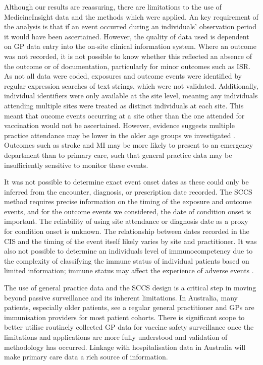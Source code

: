 \documentclass[review, endfloat]{elsarticle}
\begin{document}
Although our results are reassuring, there are limitations to the use of MedicineInsight data and the methods which were applied. An key requirement of the analysis is that if an event occurred during an individuals' observation period it would have been ascertained. However, the quality of data used is dependent on GP data entry into the on-site clinical information system. Where an outcome was not recorded, it is not possible to know whether this reflected an absence of the outcome or of documentation, particularly for minor outcomes such as ISR. As not all data were coded, exposures and outcome events were identified by regular expression searches of text strings, which were not validated. Additionally, individual identifiers were only available at the site level, meaning any individuals attending multiple sites were treated as distinct individuals at each site. This meant that oucome events occurring at a site other than the one attended for vaccination would not be ascertained. However, evidence suggests multiple practice attendance may be lower in the older age groups we investigated \citep{wright2018}. Outcomes such as stroke and MI may be more likely to present to an emergency department than to primary care, such that general practice data may be insufficiently sensitive to monitor these events. 

It was not possible to determine exact event onset dates as these could only be inferred from the encounter, diagnosis, or prescription date recorded. The SCCS method requires precise information on the timing of the exposure and outcome events, and for the outcome events we considered, the date of condition onset is important. The reliability of using site attendance or diagnosis date as a proxy for condition onset is unknown. The relationship between dates recorded in the CIS and the timing of the event itself likely varies by site and practitioner. It was also not possible to determine an individuals level of immunocompetency due to the complexity of classifying the immune status of individual patients based on limited information; immune status may affect the experience of adverse events \citep{alexander2018, greenbook}. 

The use of general practice data and the SCCS design is a critical step in moving beyond passive surveillance and its inherent limitations. In Australia, many patients, especially older patients, see a regular general practitioner and GPs are immunisation providers for most patient cohorts. There is significant scope to better utilise routinely collected GP data for vaccine safety surveillance once the limitations and applications are more fully understood and validation of methodology has occurred. Linkage with hospitalisation data in Australia will make primary care data a rich source of information.
\end{document}
